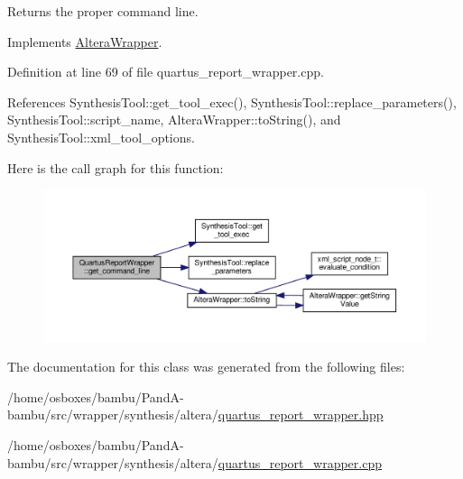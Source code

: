 Returns the proper command line. 



Implements \hyperlink{classAlteraWrapper_a1b6c44694f0bd28b6f458245fd373326}{Altera\+Wrapper}.



Definition at line 69 of file quartus\+\_\+report\+\_\+wrapper.\+cpp.



References Synthesis\+Tool\+::get\+\_\+tool\+\_\+exec(), Synthesis\+Tool\+::replace\+\_\+parameters(), Synthesis\+Tool\+::script\+\_\+name, Altera\+Wrapper\+::to\+String(), and Synthesis\+Tool\+::xml\+\_\+tool\+\_\+options.

Here is the call graph for this function\+:
\nopagebreak
\begin{figure}[H]
\begin{center}
\leavevmode
\includegraphics[width=350pt]{db/dc8/classQuartusReportWrapper_a1f864436a60dc37ac6cdaa03c720a0a6_cgraph}
\end{center}
\end{figure}


The documentation for this class was generated from the following files\+:\begin{DoxyCompactItemize}
\item 
/home/osboxes/bambu/\+Pand\+A-\/bambu/src/wrapper/synthesis/altera/\hyperlink{quartus__report__wrapper_8hpp}{quartus\+\_\+report\+\_\+wrapper.\+hpp}\item 
/home/osboxes/bambu/\+Pand\+A-\/bambu/src/wrapper/synthesis/altera/\hyperlink{quartus__report__wrapper_8cpp}{quartus\+\_\+report\+\_\+wrapper.\+cpp}\end{DoxyCompactItemize}
